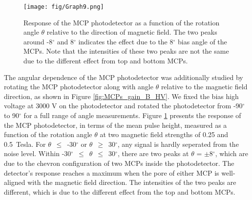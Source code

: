 \documentclass[preprint,5p]{elsarticle}
\begin{document}
\begin{figure}[tbp]
\centering \texttt{[image: fig/Graph9.png]}
\caption{Response of the MCP photodetector as a function of the rotation angle 
   $\theta$ relative to the direction of magnetic field. The two peaks around 
-8$^{\circ}$ and 8$^{\circ}$ indicates the effect due to the 8$^{\circ}$ bias 
angle of the MCPs. Note that the intensities of these two peaks are not the 
same due to the different effect from top and bottom MCPs.} 
\label{fig:MCPs_gain_theta_B}
\end{figure}
The angular dependence of the MCP photodetector was additionally studied by 
rotating the MCP photodetector along with angle $\theta$ relative to the 
magnetic field direction, as shown in Figure \ref{fig:MCPs_gain_B_HV}. We fixed 
the bias high voltage at 3000 V on the photodetector and rotated the 
photodetector from -90$^{\circ}$ to 90$^{\circ}$ for a full range of angle 
measurements. Figure \ref{fig:MCPs_gain_theta_B} presents the response of the 
MCP photodetector, in terms of the mean pulse height, measured as a function of 
the rotation angle $\theta$ at two magnetic field strengths of 0.25 and 
0.5~Tesla. For $\theta$~$\leq$~-30$^{\circ}$ or $\theta$~$\geq$~30$^{\circ}$, 
any signal is hardly seperated from the noise level. Within 
-30$^{\circ}$~$\leq$~$\theta$~$\leq$~30$^{\circ}$, there are two peaks at 
$\theta$ = $\pm$8$^{\circ}$, which are due to the chevron configuration of two 
MCPs inside the photodetector. The detector's response reaches a maximum when 
the pore of either MCP is well-aligned with the magnetic field direction.  The 
intensities of the two peaks are different, which is due to the different 
effect from the top and bottom MCPs.
\end{document}
